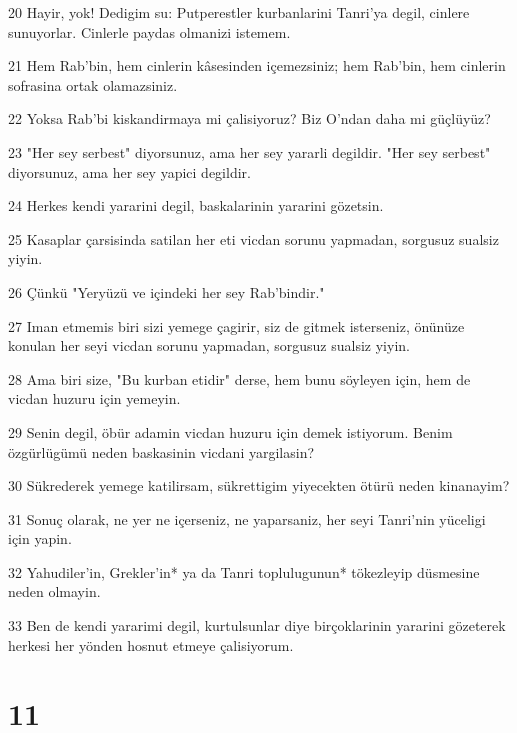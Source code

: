 \par 20 Hayir, yok! Dedigim su: Putperestler kurbanlarini Tanri'ya degil, cinlere sunuyorlar. Cinlerle paydas olmanizi istemem.
\par 21 Hem Rab'bin, hem cinlerin kâsesinden içemezsiniz; hem Rab'bin, hem cinlerin sofrasina ortak olamazsiniz.
\par 22 Yoksa Rab'bi kiskandirmaya mi çalisiyoruz? Biz O'ndan daha mi güçlüyüz?
\par 23 "Her sey serbest" diyorsunuz, ama her sey yararli degildir. "Her sey serbest" diyorsunuz, ama her sey yapici degildir.
\par 24 Herkes kendi yararini degil, baskalarinin yararini gözetsin.
\par 25 Kasaplar çarsisinda satilan her eti vicdan sorunu yapmadan, sorgusuz sualsiz yiyin.
\par 26 Çünkü "Yeryüzü ve içindeki her sey Rab'bindir."
\par 27 Iman etmemis biri sizi yemege çagirir, siz de gitmek isterseniz, önünüze konulan her seyi vicdan sorunu yapmadan, sorgusuz sualsiz yiyin.
\par 28 Ama biri size, "Bu kurban etidir" derse, hem bunu söyleyen için, hem de vicdan huzuru için yemeyin.
\par 29 Senin degil, öbür adamin vicdan huzuru için demek istiyorum. Benim özgürlügümü neden baskasinin vicdani yargilasin?
\par 30 Sükrederek yemege katilirsam, sükrettigim yiyecekten ötürü neden kinanayim?
\par 31 Sonuç olarak, ne yer ne içerseniz, ne yaparsaniz, her seyi Tanri'nin yüceligi için yapin.
\par 32 Yahudiler'in, Grekler'in* ya da Tanri toplulugunun* tökezleyip düsmesine neden olmayin.
\par 33 Ben de kendi yararimi degil, kurtulsunlar diye birçoklarinin yararini gözeterek herkesi her yönden hosnut etmeye çalisiyorum.

\chapter{11}


